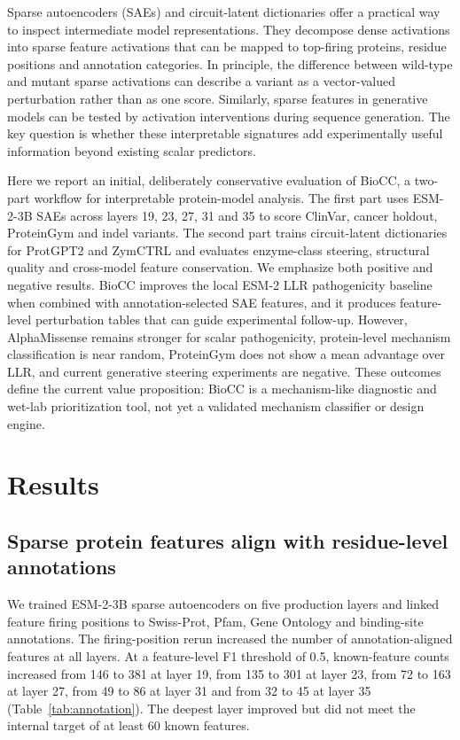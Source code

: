\documentclass[pdflatex,sn-nature]{sn-jnl}
\begin{document}
Sparse autoencoders (SAEs) and circuit-latent dictionaries offer a practical way to inspect intermediate model representations. They decompose dense activations into sparse feature activations that can be mapped to top-firing proteins, residue positions and annotation categories. In principle, the difference between wild-type and mutant sparse activations can describe a variant as a vector-valued perturbation rather than as one score. Similarly, sparse features in generative models can be tested by activation interventions during sequence generation. The key question is whether these interpretable signatures add experimentally useful information beyond existing scalar predictors.

Here we report an initial, deliberately conservative evaluation of BioCC, a two-part workflow for interpretable protein-model analysis. The first part uses ESM-2-3B SAEs across layers 19, 23, 27, 31 and 35 to score ClinVar, cancer holdout, ProteinGym and indel variants. The second part trains circuit-latent dictionaries for ProtGPT2 and ZymCTRL and evaluates enzyme-class steering, structural quality and cross-model feature conservation. We emphasize both positive and negative results. BioCC improves the local ESM-2 LLR pathogenicity baseline when combined with annotation-selected SAE features, and it produces feature-level perturbation tables that can guide experimental follow-up. However, AlphaMissense remains stronger for scalar pathogenicity, protein-level mechanism classification is near random, ProteinGym does not show a mean advantage over LLR, and current generative steering experiments are negative. These outcomes define the current value proposition: BioCC is a mechanism-like diagnostic and wet-lab prioritization tool, not yet a validated mechanism classifier or design engine.

\section{Results}\label{sec:results}

\subsection{Sparse protein features align with residue-level annotations}

We trained ESM-2-3B sparse autoencoders on five production layers and linked feature firing positions to Swiss-Prot, Pfam, Gene Ontology and binding-site annotations. The firing-position rerun increased the number of annotation-aligned features at all layers. At a feature-level F1 threshold of 0.5, known-feature counts increased from 146 to 381 at layer 19, from 135 to 301 at layer 23, from 72 to 163 at layer 27, from 49 to 86 at layer 31 and from 32 to 45 at layer 35 (Table~\ref{tab:annotation}). The deepest layer improved but did not meet the internal target of at least 60 known features.
\end{document}
